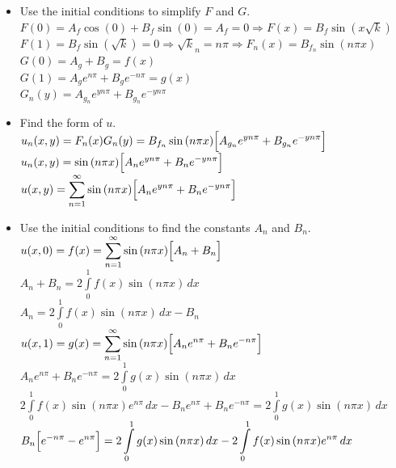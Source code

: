 \documentclass[10pt]{article}
\begin{document}
\begin{itemize}
    \item Use the initial conditions to simplify $ F $ and $ G $. \\
    \subitem $ \displaystyle F(0) = A_{f}\cos{(0)} + B_{f}\sin{(0)} = A_{f} = 0 \Rightarrow F(x) = B_{f}\sin{(x\sqrt{k})} $ \\
    \subitem $ \displaystyle F(1) = B_{f}\sin{(\sqrt{k})} = 0 \Rightarrow \sqrt{k}_n = n\pi \Rightarrow F_n(x) = B_{f_n}\sin{(n\pi x)} $ \\
    \subitem $ \displaystyle G(0) = A_{g} + B_{g} = f(x) $ \\
    \subitem $ \displaystyle G(1) = A_{g}e^{n\pi } + B_{g}e^{-n\pi } = g(x) $ \\
    \subitem $ \displaystyle G_n(y) = A_{g_n}e^{yn\pi} + B_{g_n}e^{-yn\pi} $ \\
    \item Find the form of $ u $. \\
    \subitem $ \displaystyle u_n(x,y) = F_n(x)G_n(y) = B_{f_n}\sin{(n\pi x)}\Bigl[A_{g_n}e^{yn\pi} + B_{g_n}e^{-yn\pi}\Bigr] $ \\
    \subitem $ \displaystyle u_n(x,y) = \sin{(n\pi x)}\Bigl[A_{n}e^{yn\pi } + B_{n}e^{-yn\pi }\Bigr] $ \\
    \subitem $ \displaystyle u(x,y) = \sum \limits_{n=1}^{\infty} \sin{(n\pi x)}\Bigl[A_{n}e^{yn\pi } + B_{n}e^{-yn\pi }\Bigr] $ \\
    \item Use the initial conditions to find the constants $ A_n $ and $ B_n $. \\
    \subitem $ \displaystyle u(x,0) = f(x) = \sum \limits_{n=1}^{\infty} \sin{(n\pi x)}\Bigl[A_{n} + B_{n}\Bigr] $ \\
    \subitem $ \displaystyle A_{n} + B_{n} = 2 \int \limits_{0}^{1} f(x) \sin{(n\pi x)} \,dx $ \\
    \subitem $ \displaystyle A_{n} = 2 \int \limits_{0}^{1} f(x) \sin{(n\pi x)} \,dx - B_{n} $ \\
    \subitem $ \displaystyle u(x,1) = g(x) = \sum \limits_{n=1}^{\infty} \sin{(n\pi x)}\Bigl[A_{n}e^{n\pi} + B_{n}e^{-n\pi}\Bigr] $ \\
    \subitem $ \displaystyle A_{n}e^{n\pi} + B_{n}e^{-n\pi} = 2 \int \limits_{0}^{1} g(x) \sin{(n\pi x)} \,dx $ \\
    \subitem $ \displaystyle 2 \int \limits_{0}^{1} f(x) \sin{(n\pi x)}e^{n\pi} \,dx - B_{n}e^{n\pi} + B_{n}e^{-n\pi} = 2 \int \limits_{0}^{1} g(x) \sin{(n\pi x)} \,dx $ \\
    \subitem $ \displaystyle  B_{n}\Bigl[e^{-n\pi} - e^{n\pi}\Bigr] = 2 \int \limits_{0}^{1} g(x) \sin{(n\pi x)} \,dx - 2 \int \limits_{0}^{1} f(x) \sin{(n\pi x)}e^{n\pi} \,dx $ \\

\end{itemize}
\end{document}
